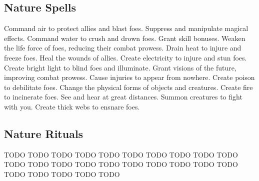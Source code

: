 \subsection{Nature Spells}\label{Nature Spells}
\begin{spelllist}
 Command air to protect allies and blast foes.
 Suppress and manipulate magical effects.
 Command water to crush and drown foes.
 Grant skill bonuses.
 Weaken the life force of foes, reducing their combat prowess.
 Drain heat to injure and freeze foes.
 Heal the wounds of allies.
 Create electricity to injure and stun foes.
 Create bright light to blind foes and illuminate.
 Grant visions of the future, improving combat prowess.
 Cause injuries to appear from nowhere.
 Create poison to debilitate foes.
 Change the physical forms of objects and creatures.
 Create fire to incinerate foes.
 See and hear at great distances.
 Summon creatures to fight with you.
 Create thick webs to ensnare foes.
\end{spelllist}
\subsection{Nature Rituals}\label{Nature Rituals}
\begin{spelllist}
 TODO
 TODO
 TODO
 TODO
 TODO
 TODO
 TODO
 TODO
 TODO
 TODO
 TODO
 TODO
 TODO
 TODO
 TODO
 TODO
 TODO
 TODO
 TODO
 TODO
 TODO
 TODO
 TODO
 TODO
 TODO
\end{spelllist}
